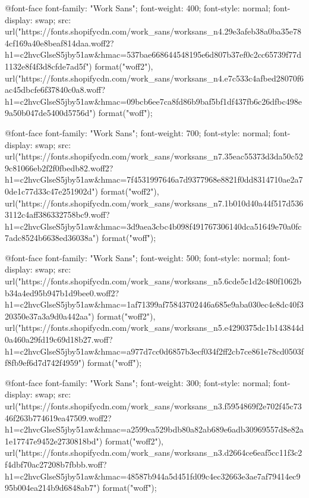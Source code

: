 @font-face {
  font-family: "Work Sans";
  font-weight: 400;
  font-style: normal;
  font-display: swap;
  src: url("https://fonts.shopifycdn.com/work_sans/worksans_n4.29e3afeb38a0ba35e784cf169a40e8beaf814daa.woff2?h1=c2hvcGlseS5jby51aw&hmac=537bae668644548195e6d807b37ef0c2cc65739f77d1132e8f4f3d8cfde7ad5f") format("woff2"),
       url("https://fonts.shopifycdn.com/work_sans/worksans_n4.e7c533c4afbed28070f6ac45dbcfe6f37840c0a8.woff?h1=c2hvcGlseS5jby51aw&hmac=09bcb6ee7ca8fd86b9baf5bf1df437fb6c26dfbc498e9a50b047de5400d5756d") format("woff");
}

  @font-face {
  font-family: "Work Sans";
  font-weight: 700;
  font-style: normal;
  font-display: swap;
  src: url("https://fonts.shopifycdn.com/work_sans/worksans_n7.35eac55373d3da50c529c81066eb2f2f0fbedb82.woff2?h1=c2hvcGlseS5jby51aw&hmac=7f4531997646a7d9377968e8821f0dd8314710ae2a70de1c77d33c47e251902d") format("woff2"),
       url("https://fonts.shopifycdn.com/work_sans/worksans_n7.1b010d40a44f517d5363112c4aff386332758bc9.woff?h1=c2hvcGlseS5jby51aw&hmac=3d9aea3cbc4b098f491767306140dca51649e70a0fc7adc8524b6638ed36038a") format("woff");
}

  @font-face {
  font-family: "Work Sans";
  font-weight: 500;
  font-style: normal;
  font-display: swap;
  src: url("https://fonts.shopifycdn.com/work_sans/worksans_n5.6cde5c1d2c480f1062bb34a4ed95b947b1d9bee0.woff2?h1=c2hvcGlseS5jby51aw&hmac=1af71399af75843702446a685e9aba030ec4e8dc40f320350e37a3a9d0a442aa") format("woff2"),
       url("https://fonts.shopifycdn.com/work_sans/worksans_n5.e4290375dc1b143844d0a460a29fd19c69d18b27.woff?h1=c2hvcGlseS5jby51aw&hmac=a977d7cc0d6857b3ecf034f2ff2cb7ce861e78cd0503ff8fb9ef6d7d742f4959") format("woff");
}

  @font-face {
  font-family: "Work Sans";
  font-weight: 300;
  font-style: normal;
  font-display: swap;
  src: url("https://fonts.shopifycdn.com/work_sans/worksans_n3.f5954869f2e702f45c7346f263b774619ea47509.woff2?h1=c2hvcGlseS5jby51aw&hmac=a2599ca529bdb80a82ab689e6adb30969557d8e82a1e17747e9452e2730818bd") format("woff2"),
       url("https://fonts.shopifycdn.com/work_sans/worksans_n3.d2664ce6eaf5cc11f3c2f4dbf70ac27208b7fbbb.woff?h1=c2hvcGlseS5jby51aw&hmac=48587b944a5d451fd09c4ec32663e3ae7af79414ec995b004ea214b9d6848ab7") format("woff");
}

